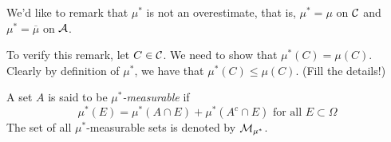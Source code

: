 We'd like to remark that $\mu ^{*}$ is not an overestimate, that is, $\mu ^{*} = \mu$ on ${\cal C}$ and $\mu ^{*} = \overline \mu$ on ${\cal A}$.

To verify this remark, let $C \in {\cal C}$. We need to show that $\mu ^{*} (C) = \mu (C)$. Clearly by definition of $\mu ^{*}$, we have that $\mu ^{*} \left( C \right) \le \mu \left( C \right)$. (Fill the details!)

\begin{definition}
    A set $A$ is said to be \textit{$\mu^{*}$-measurable} if 
    \begin{equation*}
	\mu ^{*} \left( E \right) = \mu ^{*} (A\cap E ) + \mu ^{*} (A^c \cap E) \text{ for all } E \subset \Omega 
    \end{equation*}
    The set of all $\mu ^{*}$-measurable sets is denoted by ${\cal M} _{\mu ^{*}}$.
    \label{def:measurable-set}
\end{definition}


